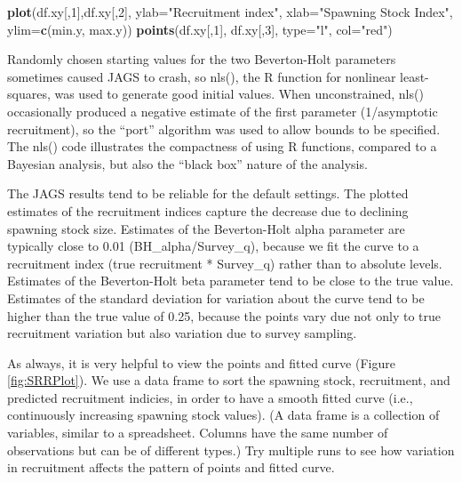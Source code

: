 \documentclass[
]{krantz}
\makeatletter
\newenvironment{Shaded}{\begin{snugshade}}{\end{snugshade}}
\newcommand{\AttributeTok}[1]{\textcolor[rgb]{0.27,0.27,0.27}{#1}}
\newcommand{\DecValTok}[1]{\textcolor[rgb]{0.06,0.06,0.06}{#1}}
\newcommand{\FunctionTok}[1]{\textcolor[rgb]{0.27,0.27,0.27}{\textbf{#1}}}
\newcommand{\NormalTok}[1]{#1}
\newcommand{\StringTok}[1]{\textcolor[rgb]{0.5,0.5,0.5}{#1}}
\newenvironment{kframe}{%
\medskip{}
\setlength{\fboxsep}{.8em}
 \def\at@end@of@kframe{}%
 \ifinner\ifhmode%
  \def\at@end@of@kframe{\end{minipage}}%
  \begin{minipage}{\columnwidth}%
 \fi\fi%
 \def\FrameCommand##1{\hskip\@totalleftmargin \hskip-\fboxsep
 \colorbox{shadecolor}{##1}\hskip-\fboxsep
     \hskip-\linewidth \hskip-\@totalleftmargin \hskip\columnwidth}%
 \MakeFramed {\advance\hsize-\width
   \@totalleftmargin\z@ \linewidth\hsize
   \@setminipage}}%
 {\par\unskip\endMakeFramed%
 \at@end@of@kframe}
\renewenvironment{Shaded}{\begin{kframe}}{\end{kframe}}
\makeatother
\begin{document}
\begin{Shaded}
\begin{Highlighting}[]
\FunctionTok{plot}\NormalTok{(df.xy[,}\DecValTok{1}\NormalTok{],df.xy[,}\DecValTok{2}\NormalTok{], }\AttributeTok{ylab=}\StringTok{"Recruitment index"}\NormalTok{,}
     \AttributeTok{xlab=}\StringTok{"Spawning Stock Index"}\NormalTok{, }\AttributeTok{ylim=}\FunctionTok{c}\NormalTok{(min.y, max.y))}
\FunctionTok{points}\NormalTok{(df.xy[,}\DecValTok{1}\NormalTok{], df.xy[,}\DecValTok{3}\NormalTok{], }\AttributeTok{type=}\StringTok{"l"}\NormalTok{, }\AttributeTok{col=}\StringTok{"red"}\NormalTok{)}
\end{Highlighting}
\end{Shaded}

Randomly chosen starting values for the two Beverton-Holt parameters sometimes caused JAGS to crash, so nls(), the R function for nonlinear least-squares, was used to generate good initial values. When unconstrained, nls() occasionally produced a negative estimate of the first parameter (1/asymptotic recruitment), so the ``port'' algorithm was used to allow bounds to be specified. The nls() code illustrates the compactness of using R functions, compared to a Bayesian analysis, but also the ``black box'' nature of the analysis.

The JAGS results tend to be reliable for the default settings. The plotted estimates of the recruitment indices capture the decrease due to declining spawning stock size. Estimates of the Beverton-Holt alpha parameter are typically close to 0.01 (BH\_alpha/Survey\_q), because we fit the curve to a recruitment index (true recruitment * Survey\_q) rather than to absolute levels. Estimates of the Beverton-Holt beta parameter tend to be close to the true value. Estimates of the standard deviation for variation about the curve tend to be higher than the true value of 0.25, because the points vary due not only to true recruitment variation but also variation due to survey sampling.

As always, it is very helpful to view the points and fitted curve (Figure \ref{fig:SRRPlot}). We use a data frame to sort the spawning stock, recruitment, and predicted recruitment indicies, in order to have a smooth fitted curve (i.e., continuously increasing spawning stock values). (A data frame is a collection of variables, similar to a spreadsheet. Columns have the same number of observations but can be of different types.) Try multiple runs to see how variation in recruitment affects the pattern of points and fitted curve.
\end{document}
